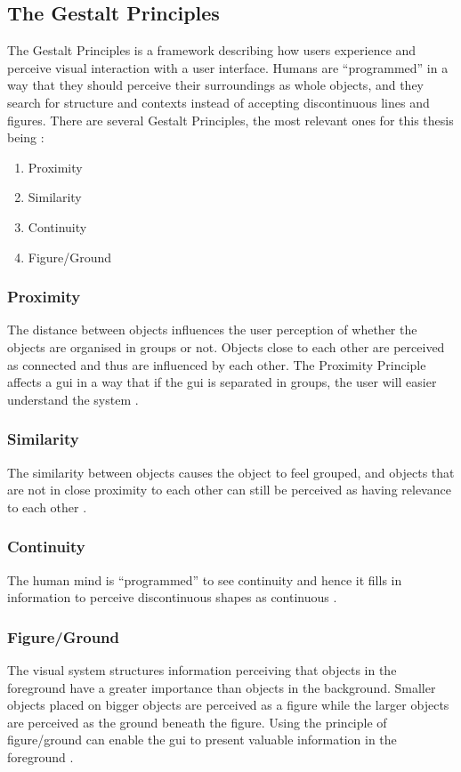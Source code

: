 \subsection{The Gestalt Principles}
\label{sec:gestaltprinciples}
The Gestalt Principles is a framework describing how users experience and perceive visual interaction with a user interface. Humans are ``programmed'' in a way that they should perceive their surroundings as whole objects, and they search for structure and contexts instead of accepting discontinuous lines and figures. There are several Gestalt Principles, the most relevant ones for this thesis being \cite{johnson}:
\begin{enumerate}
     \item Proximity
     \item Similarity
     \item Continuity
     \item Figure/Ground
 \end{enumerate}

\subsubsection{Proximity}
\label{sec:proximity}
The distance between objects influences the user perception of whether the objects are organised in groups or not. Objects close to each other are perceived as connected and thus are influenced by each other. The Proximity Principle affects a \acrfull{gui} in a way that if the \acrshort{gui} is separated in groups, the user will easier understand the system \cite{johnson}.

\subsubsection{Similarity}
\label{sec:similarity}
The similarity between objects causes the object to feel grouped, and objects that are not in close proximity to each other can still be perceived as having relevance to each other \cite{johnson}.

\subsubsection{Continuity}
\label{sec:continuity}
The human mind is ``programmed'' to see continuity and hence it fills in information to perceive discontinuous shapes as continuous \cite{johnson}.

\subsubsection{Figure/Ground}
\label{sec:figureground}
The visual system structures information perceiving that objects in the foreground have a greater importance than objects in the background. Smaller objects placed on bigger objects are perceived as a figure while the larger objects are perceived as the ground beneath the figure. Using the principle of figure/ground can enable the \acrshort{gui} to present valuable information in the foreground \cite{johnson}.
